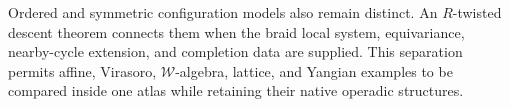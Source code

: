 \documentclass[11pt]{memoir}
\begin{document}
Ordered and symmetric configuration models also remain distinct.
An $R$-twisted descent theorem connects them when the braid local
system, equivariance, nearby-cycle extension, and completion data are
supplied.  This separation permits affine, Virasoro,
$\mathcal W$-algebra, lattice, and Yangian examples to be compared
inside one atlas while retaining their native operadic structures.













\end{document}
